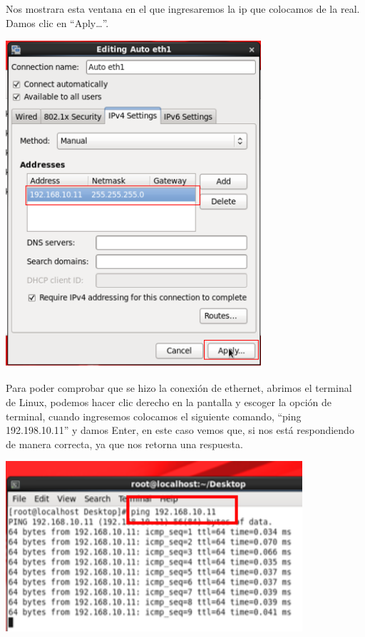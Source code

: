 Nos mostrara esta ventana en el que ingresaremos la ip que colocamos de la real. Damos clic en “Aply…”.
	\begin{center}
		\includegraphics[width=9.5cm]{./Imagenes/38} 
	\end{center} 

\vspace{\baselineskip}

Para poder comprobar que se hizo la conexión de ethernet, abrimos el terminal de Linux, podemos hacer clic derecho en la pantalla y escoger la opción de terminal, cuando ingresemos colocamos el siguiente comando, “ping 192.198.10.11” y damos Enter, en este caso vemos que, si nos está respondiendo de manera correcta, ya que nos retorna una respuesta. 
	\begin{center}
		\includegraphics[width=11cm]{./Imagenes/39} 
	\end{center} 

